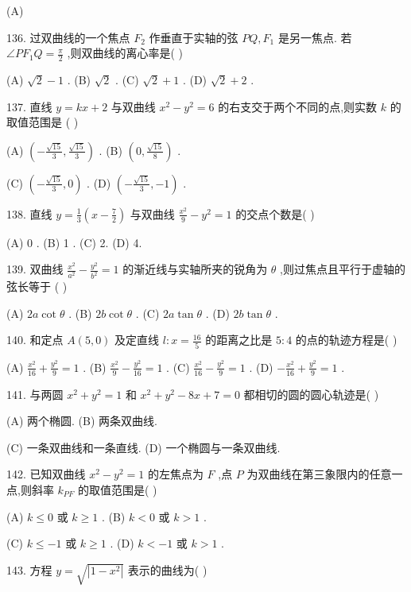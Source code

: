 \documentclass[10pt]{article}
\begin{document}
(A)

136. 过双曲线的一个焦点 \({F}_{2}\) 作垂直于实轴的弦 \({PQ},{F}_{1}\) 是另一焦点. 若 \(\angle P{F}_{1}Q = \frac{\pi }{2}\) ,则双曲线的离心率是( )

(A) \(\sqrt{2} - 1\) . (B) \(\sqrt{2}\) . (C) \(\sqrt{2} + 1\) . (D) \(\sqrt{2} + 2\) .

137. 直线 \(y = {kx} + 2\) 与双曲线 \({x}^{2} - {y}^{2} = 6\) 的右支交于两个不同的点,则实数 \(k\) 的取值范围是 ( )

(A) \(\left( {-\frac{\sqrt{15}}{3},\frac{\sqrt{15}}{3}}\right)\) . (B) \(\left( {0,\frac{\sqrt{15}}{8}}\right)\) .

(C) \(\left( {-\frac{\sqrt{15}}{3},0}\right)\) . (D) \(\left( {-\frac{\sqrt{15}}{3}, - 1}\right)\) .

138. 直线 \(y = \frac{1}{3}\left( {x - \frac{7}{2}}\right)\) 与双曲线 \(\frac{{x}^{2}}{9} - {y}^{2} = 1\) 的交点个数是( )

(A) 0 . (B) 1 . (C) 2. (D) 4.

139. 双曲线 \(\frac{{x}^{2}}{{a}^{2}} - \frac{{y}^{2}}{{b}^{2}} = 1\) 的渐近线与实轴所夹的锐角为 \(\theta\) ,则过焦点且平行于虚轴的弦长等于 ( )

(A) \({2a}\cot \theta\) . (B) \({2b}\cot \theta\) . (C) \({2a}\tan \theta\) . (D) \({2b}\tan \theta\) .

140. 和定点 \(A\left( {5,0}\right)\) 及定直线 \(l : x = \frac{16}{5}\) 的距离之比是 \(5 : 4\) 的点的轨迹方程是( )

(A) \(\frac{{x}^{2}}{16} + \frac{{y}^{2}}{9} = 1\) . (B) \(\frac{{x}^{2}}{9} - \frac{{y}^{2}}{16} = 1\) . (C) \(\frac{{x}^{2}}{16} - \frac{{y}^{2}}{9} = 1\) . (D) \(- \frac{{x}^{2}}{16} + \frac{{y}^{2}}{9} = 1\) .

141. 与两圆 \({x}^{2} + {y}^{2} = 1\) 和 \({x}^{2} + {y}^{2} - {8x} + 7 = 0\) 都相切的圆的圆心轨迹是( )

(A) 两个椭圆. (B) 两条双曲线.

(C) 一条双曲线和一条直线. (D) 一个椭圆与一条双曲线.

142. 已知双曲线 \({x}^{2} - {y}^{2} = 1\) 的左焦点为 \(F\) ,点 \(P\) 为双曲线在第三象限内的任意一点,则斜率 \({k}_{PF}\) 的取值范围是( )

(A) \(k \leq  0\) 或 \(k \geq  1\) . (B) \(k < 0\) 或 \(k > 1\) .

(C) \(k \leq   - 1\) 或 \(k \geq  1\) . (D) \(k <  - 1\) 或 \(k > 1\) .

143. 方程 \(y = \sqrt{\left| 1 - {x}^{2}\right| }\) 表示的曲线为( )
\end{document}
